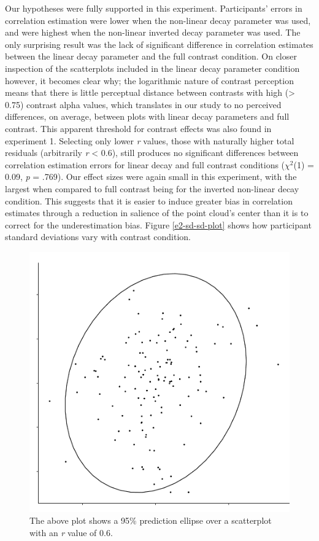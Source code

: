 \documentclass[preprint, 3p,
authoryear]{elsarticle} %
\begin{document}
Our hypotheses were fully supported in this experiment. Participants'
errors in correlation estimation were lower when the non-linear decay
parameter was used, and were highest when the non-linear inverted decay
parameter was used. The only surprising result was the lack of
significant difference in correlation estimates between the linear decay
parameter and the full contrast condition. On closer inspection of the
scatterplots included in the linear decay parameter condition however,
it becomes clear why; the logarithmic nature of contrast perception
\citep{varshney_2013, fechner_1948} means that there is little
perceptual distance between contrasts with high (\textgreater{} 0.75)
contrast alpha values, which translates in our study to no perceived
differences, on average, between plots with linear decay parameters and
full contrast. This apparent threshold for contrast effects was also
found in experiment 1. Selecting only lower \emph{r} values, those with
naturally higher total residuals (arbitrarily \emph{r} \textless{} 0.6),
still produces no significant differences between correlation estimation
errors for linear decay and full contrast conditions (\(\chi^2\)(1) =
0.09, \emph{p} = .769). Our effect sizes were again small in this
experiment, with the largest when compared to full contrast being for
the inverted non-linear decay condition. This suggests that it is easier
to induce greater bias in correlation estimates through a reduction in
salience of the point cloud's center than it is to correct for the
underestimation bias. Figure \ref{e2-sd-sd-plot} shows how participant
standard deviations vary with contrast condition.

\begin{figure}

\includegraphics[width=0.5\linewidth]{contrast_and_scatterplots_files/figure-latex/prediction-ellipse-1} \hfill{}

\caption{\label{prediction-ellipse}The above plot shows a 95\% prediction ellipse over a scatterplot with an \textit{r} value of 0.6.}\label{fig:prediction-ellipse}
\end{figure}
\end{document}
